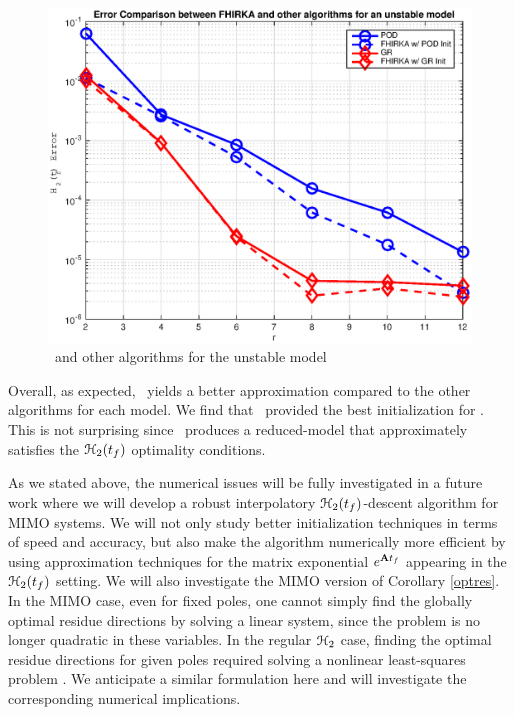 \documentclass[twocolumn]{autart}
\begin{document}
  \begin{figure}[H]
 \centering
   \includegraphics [scale=0.4]{ErrorVSrUNSF}
      \caption{\FH \ and other algorithms for the unstable model \label{fig:uns}}
 \end{figure}

 
 
  Overall,  as expected, \FH \ yields a better approximation compared to the other algorithms for each model. 
 We find that \goyal\  provided the best initialization for \FH. This is not surprising since \goyal\ produces a reduced-model that approximately satisfies the $\EuScript{H}_2(t_f)$ optimality conditions. 
 
 As we stated above, the numerical issues will be fully investigated  in a future work where we will develop a robust interpolatory $\EuScript{H}_2(t_f)$-descent algorithm for MIMO systems. We will not only study better initialization techniques in terms of speed and accuracy, but also make the algorithm numerically more efficient by using approximation  techniques for the matrix exponential $e^{\mathbf{A} t_f}$ appearing in the $\EuScript{H}_2(t_f)$ setting. 
We will also investigate the MIMO version of Corollary \ref{optres}. In the MIMO case, even for fixed poles, one cannot simply find the globally optimal residue directions by solving a linear system, since the problem is no longer quadratic in these variables. In the regular $\EuScript{H}_2$ case, finding the optimal residue directions for given poles required solving a nonlinear least-squares problem \cite{beattie2012realization}. We anticipate a similar formulation here and will investigate the corresponding numerical implications. 
 
\end{document}
